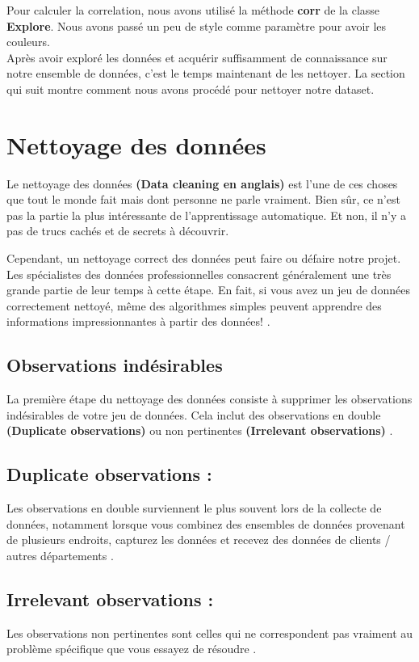 \documentclass[12pt, french]{report}
\begin{document}
Pour calculer la correlation, nous avons utilisé la méthode \textbf{corr} de  la classe \textbf{Explore}. Nous avons passé un peu de style comme paramètre pour avoir les couleurs.  \\
 
Après avoir exploré les données et acquérir suffisamment de connaissance sur notre ensemble de données, c'est le temps maintenant de les nettoyer. La section qui suit montre comment nous avons procédé pour nettoyer notre dataset.

\section{Nettoyage des données}
Le nettoyage des données \textbf{(Data cleaning en anglais)} est l'une de ces choses que tout le monde fait mais dont personne ne parle vraiment. Bien sûr, ce n'est pas la partie la plus intéressante de l'apprentissage automatique. Et non, il n'y a pas de trucs cachés et de secrets à découvrir.

Cependant, un nettoyage correct des données peut faire ou défaire notre projet. Les spécialistes des données professionnelles consacrent généralement une très grande partie de leur temps à cette étape. En fait, si vous avez un jeu de données correctement nettoyé, même des algorithmes simples peuvent apprendre des informations impressionnantes à partir des données! \cite{key21}.

\subsection{Observations indésirables} La première étape du nettoyage des données consiste à supprimer les observations indésirables de votre jeu de données. Cela inclut des observations en double \textbf{(Duplicate observations)} ou non pertinentes \textbf{(Irrelevant observations)} \cite{key21}.

\subsection{Duplicate observations :} Les observations en double surviennent le plus souvent lors de la collecte de données, notamment lorsque vous combinez des ensembles de données provenant de plusieurs endroits, capturez les données et recevez des données de clients / autres départements \cite{key21}.

\subsection{Irrelevant observations :} Les observations non pertinentes sont celles qui ne correspondent pas vraiment au problème spécifique que vous essayez de résoudre \cite{key21}. \\
\end{document}

